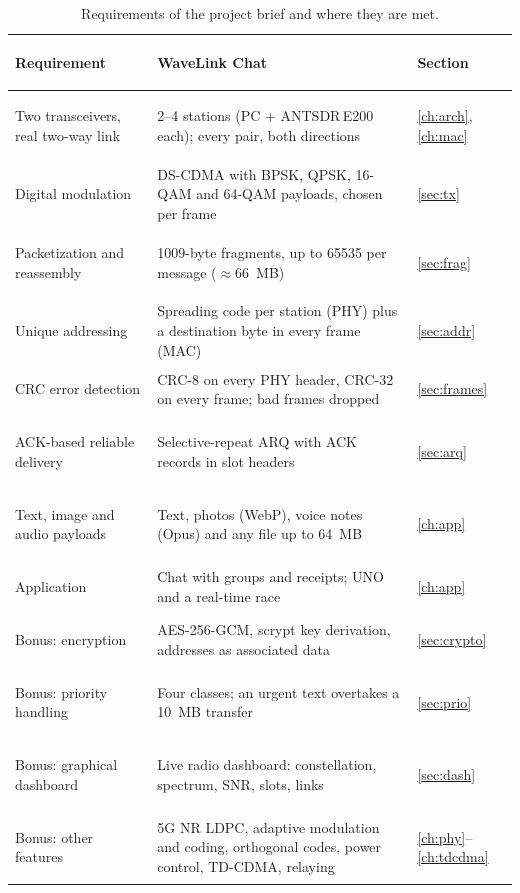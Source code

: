 \documentclass[11pt,a4paper,oneside]{report}
\begin{document}
\begin{table}[htbp]
\centering\small
\caption{Requirements of the project brief and where they are met.}\label{tab:brief}
\begin{tabularx}{\linewidth}{@{}>{\bfseries\raggedright\arraybackslash}p{40mm}L>{\raggedright\arraybackslash}p{17mm}@{}}
\toprule
Requirement & WaveLink Chat & Section\\
\midrule
Two transceivers, real two-way link & 2--4 stations (PC + ANTSDR\,E200 each); every pair, both directions & \ref{ch:arch}, \ref{ch:mac}\\
Digital modulation & DS-CDMA with BPSK, QPSK, 16-QAM and 64-QAM payloads, chosen per frame & \ref{sec:tx}\\
Packetization and reassembly & \num{1009}-byte fragments, up to \num{65535} per message ($\approx$\SI{66}{MB}) & \ref{sec:frag}\\
Unique addressing & Spreading code per station (PHY) plus a destination byte in every frame (MAC) & \ref{sec:addr}\\
CRC error detection & CRC-8 on every PHY header, CRC-32 on every frame; bad frames dropped & \ref{sec:frames}\\
ACK-based reliable delivery & Selective-repeat ARQ with ACK records in slot headers & \ref{sec:arq}\\
Text, image and audio payloads & Text, photos (WebP), voice notes (Opus) and any file up to \SI{64}{MB} & \ref{ch:app}\\
Application & Chat with groups and receipts; UNO and a real-time race & \ref{ch:app}\\
\midrule
\textcolor{wldeep}{Bonus:} encryption & AES-256-GCM, scrypt key derivation, addresses as associated data & \ref{sec:crypto}\\
\textcolor{wldeep}{Bonus:} priority handling & Four classes; an urgent text overtakes a \SI{10}{MB} transfer & \ref{sec:prio}\\
\textcolor{wldeep}{Bonus:} graphical dashboard & Live radio dashboard: constellation, spectrum, SNR, slots, links & \ref{sec:dash}\\
\textcolor{wldeep}{Bonus:} other features & 5G NR LDPC, adaptive modulation and coding, orthogonal codes, power control, TD-CDMA, relaying & \ref{ch:phy}--\ref{ch:tdcdma}\\
\bottomrule
\end{tabularx}
\end{table}
\end{document}
